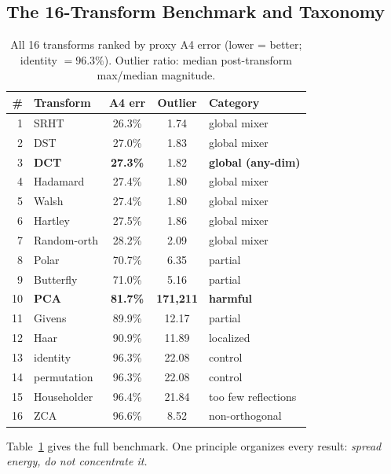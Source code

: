 \documentclass[conference]{IEEEtran}
\begin{document}
\subsection{The 16-Transform Benchmark and Taxonomy}
\label{sec:zoo}

\begin{table}[t]\centering\small
\caption{All 16 transforms ranked by proxy A4 error (lower = better; identity
$= 96.3\%$). Outlier ratio: median post-transform max/median magnitude.}
\label{tab:zoo}
\begin{tabular}{rlccl}
\toprule
\# & Transform & A4 err & Outlier & Category \\
\midrule
1  & SRHT         & 26.3\% & 1.74 & global mixer \\
2  & DST          & 27.0\% & 1.83 & global mixer \\
3  & \textbf{DCT} & \textbf{27.3\%} & 1.82 & \textbf{global (any-dim)} \\
4  & Hadamard     & 27.4\% & 1.80 & global mixer \\
5  & Walsh        & 27.4\% & 1.80 & global mixer \\
6  & Hartley      & 27.5\% & 1.86 & global mixer \\
7  & Random-orth  & 28.2\% & 2.09 & global mixer \\
\midrule
8  & Polar        & 70.7\% & 6.35 & partial \\
9  & Butterfly    & 71.0\% & 5.16 & partial \\
\midrule
10 & \textbf{PCA} & \textbf{81.7\%} & \textbf{171{,}211} & \textbf{harmful} \\
11 & Givens       & 89.9\% & 12.17 & partial \\
12 & Haar         & 90.9\% & 11.89 & localized \\
13 & identity     & 96.3\% & 22.08 & control \\
14 & permutation  & 96.3\% & 22.08 & control \\
15 & Householder  & 96.4\% & 21.84 & too few reflections \\
16 & ZCA          & 96.6\% & 8.52  & non-orthogonal \\
\bottomrule
\end{tabular}
\end{table}

Table~\ref{tab:zoo} gives the full benchmark. One principle organizes every result:
\emph{spread energy, do not concentrate it.}
\end{document}
